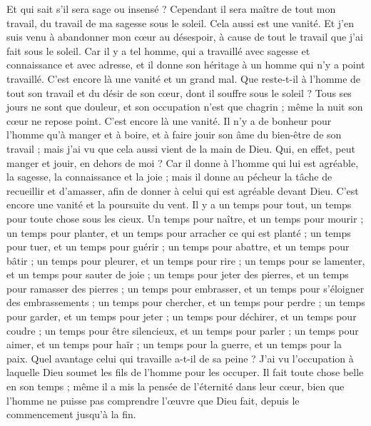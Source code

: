 \begin{multicols}{2}
Et qui sait s'il sera sage ou insensé ? Cependant il sera maître de tout mon travail, du travail de ma sagesse sous le soleil. Cela aussi est une vanité.
Et j’en suis venu à abandonner mon cœur au désespoir, à cause de tout le travail que j’ai fait sous le soleil.
Car il y a tel homme, qui a travaillé avec sagesse et connaissance et avec adresse, et il donne son héritage à un homme qui n'y a point travaillé. C’est encore là une vanité et un grand mal.
Que reste-t-il à l'homme de tout son travail et du désir de son cœur, dont il souffre sous le soleil ?
Tous ses jours ne sont que douleur, et son occupation n’est que chagrin ; même la nuit son cœur ne repose point. C’est encore là une vanité.
Il n’y a de bonheur pour l'homme qu’à manger et à boire, et à faire jouir son âme du bien-être de son travail ; mais j'ai vu que cela aussi vient de la main de Dieu.
Qui, en effet, peut manger et jouir, en dehors de moi ?
Car il donne à l’homme qui lui est agréable, la sagesse, la connaissance et la joie ; mais il donne au pécheur la tâche de recueillir et d’amasser, afin de donner à celui qui est agréable devant Dieu. C’est encore une vanité et la poursuite du vent.
\VerseOne{}Il y a un temps pour tout, un temps pour toute chose sous les cieux.
Un temps pour naître, et un temps pour mourir ; un temps pour planter, et un temps pour arracher ce qui est planté ;
un temps pour tuer, et un temps pour guérir ; un temps pour abattre, et un temps pour bâtir ;
un temps pour pleurer, et un temps pour rire ; un temps pour se lamenter, et un temps pour sauter de joie ;
un temps pour jeter des pierres, et un temps pour ramasser des pierres ; un temps pour embrasser, et un temps pour s'éloigner des embrassements ;
un temps pour chercher, et un temps pour perdre ; un temps pour garder, et un temps pour jeter ;
un temps pour déchirer, et un temps pour coudre ; un temps pour être silencieux, et un temps pour parler ;
un temps pour aimer, et un temps pour haïr ; un temps pour la guerre, et un temps pour la paix.
Quel avantage celui qui travaille a-t-il de sa peine ?
J'ai vu l’occupation à laquelle Dieu soumet les fils de l’homme pour les occuper.
Il fait toute chose belle en son temps ; même il a mis la pensée de l’éternité dans leur cœur, bien que l'homme ne puisse pas comprendre l’œuvre que Dieu fait, depuis le commencement jusqu’à la fin.

\end{multicols}
